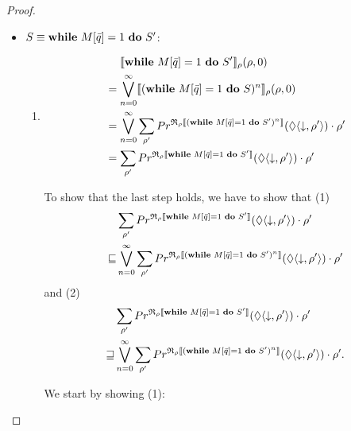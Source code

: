 \documentclass[a4paper,UKenglish,cleveref, autoref, thm-restate]{lipics-v2021}
\begin{document}
\begin{proof}
\begin{enumerate}
\begin{itemize}
        \item $S \equiv \mathbf{while } \text{ }M[\Bar{q}]=1 \text{ }\mathbf{ do } \text{ }S'$:
       \begin{enumerate}
            \item \begin{align*}
                &\phantom{=.}\llbracket \mathbf{while } \text{ }M[\Bar{q}]=1 \text{ }\mathbf{ do } \text{ }S' \rrbracket_{\rho}(\rho,0) \\
            &= \bigvee_{n=0}^\infty \llbracket (\mathbf{while } \text{ }M[\Bar{q}]=1 \text{ }\mathbf{ do } \text{ }S)^n \rrbracket_{\rho} (\rho,0) \\
            &= \bigvee_{n=0}^\infty \sum_{\rho'} Pr^{\mathfrak{R}_{\rho}\llbracket (\mathbf{while } \text{ }M[\Bar{q}]=1 \text{ }\mathbf{ do } \text{ }S')^n \rrbracket}(\lozenge \langle \downarrow , \rho' \rangle) \cdot \rho'\\
            &= \sum_{\rho'} Pr^{\mathfrak{R}_{\rho}\llbracket \mathbf{while } \text{ }M[\Bar{q}]=1 \text{ }\mathbf{ do } \text{ }S' \rrbracket}(\lozenge \langle \downarrow , \rho' \rangle) \cdot \rho'
        \end{align*}

        To show that the last step holds, we have to show that (1)
        \begin{align*}
            &\sum_{\rho'} Pr^{\mathfrak{R}_{\rho}\llbracket \mathbf{while } \text{ }M[\Bar{q}]=1 \text{ }\mathbf{ do } \text{ }S' \rrbracket}(\lozenge \langle \downarrow , \rho' \rangle) \cdot \rho' \\
            \sqsubseteq &\bigvee_{n=0}^\infty \sum_{\rho'} Pr^{\mathfrak{R}_{\rho}\llbracket (\mathbf{while } \text{ }M[\Bar{q}]=1 \text{ }\mathbf{ do } \text{ }S')^n \rrbracket}(\lozenge \langle \downarrow , \rho' \rangle) \cdot \rho'
        \end{align*}
        and (2)
        \begin{align*}
            &\sum_{\rho'} Pr^{\mathfrak{R}_{\rho}\llbracket \mathbf{while } \text{ }M[\Bar{q}]=1 \text{ }\mathbf{ do } \text{ }S' \rrbracket}(\lozenge \langle \downarrow , \rho' \rangle) \cdot \rho'\\ \sqsupseteq &\bigvee_{n=0}^\infty \sum_{\rho'} Pr^{\mathfrak{R}_{\rho}\llbracket (\mathbf{while } \text{ }M[\Bar{q}]=1 \text{ }\mathbf{ do } \text{ }S')^n \rrbracket}(\lozenge \langle \downarrow , \rho' \rangle) \cdot \rho'.
        \end{align*}

        We start by showing (1):


\end{enumerate}
\end{itemize}
\end{enumerate}
\end{proof}
\end{document}
